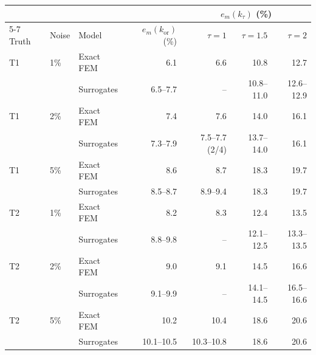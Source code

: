 \begin{tabular}{lllrrrr}
\toprule
 & & & & \multicolumn{3}{c}{$e_m(k_\tau)$ (\%)} \\
\cmidrule(lr){5-7}
Truth & Noise & Model & $e_m(k_{\mathrm{or}})$ (\%) & $\tau=1$ & $\tau=1.5$ & $\tau=2$ \\
\midrule
T1 & 1\% & Exact FEM & 6.1 & 6.6 & 10.8 & 12.7 \\
 & & Surrogates & 6.5--7.7 & -- & 10.8--11.0 & 12.6--12.9 \\
T1 & 2\% & Exact FEM & 7.4 & 7.6 & 14.0 & 16.1 \\
 & & Surrogates & 7.3--7.9 & 7.5--7.7 (2/4) & 13.7--14.0 & 16.1 \\
T1 & 5\% & Exact FEM & 8.6 & 8.7 & 18.3 & 19.7 \\
 & & Surrogates & 8.5--8.7 & 8.9--9.4 & 18.3 & 19.7 \\
\midrule
T2 & 1\% & Exact FEM & 8.2 & 8.3 & 12.4 & 13.5 \\
 & & Surrogates & 8.8--9.8 & -- & 12.1--12.5 & 13.3--13.5 \\
T2 & 2\% & Exact FEM & 9.0 & 9.1 & 14.5 & 16.6 \\
 & & Surrogates & 9.1--9.9 & -- & 14.1--14.5 & 16.5--16.6 \\
T2 & 5\% & Exact FEM & 10.2 & 10.4 & 18.6 & 20.6 \\
 & & Surrogates & 10.1--10.5 & 10.3--10.8 & 18.6 & 20.6 \\
\bottomrule
\end{tabular}
